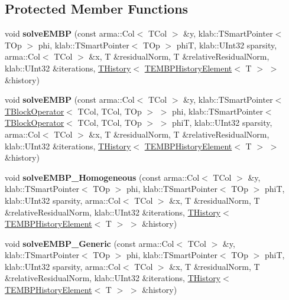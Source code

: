 \subsection*{Protected Member Functions}
\begin{DoxyCompactItemize}
\item 
void {\bfseries solve\+E\+M\+BP} (const arma\+::\+Col$<$ T\+Col $>$ \&y, klab\+::\+T\+Smart\+Pointer$<$ T\+Op $>$ phi, klab\+::\+T\+Smart\+Pointer$<$ T\+Op $>$ phiT, klab\+::\+U\+Int32 sparsity, arma\+::\+Col$<$ T\+Col $>$ \&x, T \&residual\+Norm, T \&relative\+Residual\+Norm, klab\+::\+U\+Int32 \&iterations, \hyperlink{classkl1p_1_1THistory}{T\+History}$<$ \hyperlink{classkl1p_1_1TEMBPHistoryElement}{T\+E\+M\+B\+P\+History\+Element}$<$ T $>$ $>$ \&history)\hypertarget{classkl1p_1_1TEMBPSolver_a47d227e9eda5cca46bd5c8539aa6547f}{}\label{classkl1p_1_1TEMBPSolver_a47d227e9eda5cca46bd5c8539aa6547f}

\item 
void {\bfseries solve\+E\+M\+BP} (const arma\+::\+Col$<$ T\+Col $>$ \&y, klab\+::\+T\+Smart\+Pointer$<$ \hyperlink{classkl1p_1_1TBlockOperator}{T\+Block\+Operator}$<$ T\+Col, T\+Col, T\+Op $>$ $>$ phi, klab\+::\+T\+Smart\+Pointer$<$ \hyperlink{classkl1p_1_1TBlockOperator}{T\+Block\+Operator}$<$ T\+Col, T\+Col, T\+Op $>$ $>$ phiT, klab\+::\+U\+Int32 sparsity, arma\+::\+Col$<$ T\+Col $>$ \&x, T \&residual\+Norm, T \&relative\+Residual\+Norm, klab\+::\+U\+Int32 \&iterations, \hyperlink{classkl1p_1_1THistory}{T\+History}$<$ \hyperlink{classkl1p_1_1TEMBPHistoryElement}{T\+E\+M\+B\+P\+History\+Element}$<$ T $>$ $>$ \&history)\hypertarget{classkl1p_1_1TEMBPSolver_a78f4dd58130e5ce14e4e732b6b2e2f90}{}\label{classkl1p_1_1TEMBPSolver_a78f4dd58130e5ce14e4e732b6b2e2f90}

\item 
void {\bfseries solve\+E\+M\+B\+P\+\_\+\+Homogeneous} (const arma\+::\+Col$<$ T\+Col $>$ \&y, klab\+::\+T\+Smart\+Pointer$<$ T\+Op $>$ phi, klab\+::\+T\+Smart\+Pointer$<$ T\+Op $>$ phiT, klab\+::\+U\+Int32 sparsity, arma\+::\+Col$<$ T\+Col $>$ \&x, T \&residual\+Norm, T \&relative\+Residual\+Norm, klab\+::\+U\+Int32 \&iterations, \hyperlink{classkl1p_1_1THistory}{T\+History}$<$ \hyperlink{classkl1p_1_1TEMBPHistoryElement}{T\+E\+M\+B\+P\+History\+Element}$<$ T $>$ $>$ \&history)\hypertarget{classkl1p_1_1TEMBPSolver_a10338258f5776caa83cfda65f908d00d}{}\label{classkl1p_1_1TEMBPSolver_a10338258f5776caa83cfda65f908d00d}

\item 
void {\bfseries solve\+E\+M\+B\+P\+\_\+\+Generic} (const arma\+::\+Col$<$ T\+Col $>$ \&y, klab\+::\+T\+Smart\+Pointer$<$ T\+Op $>$ phi, klab\+::\+T\+Smart\+Pointer$<$ T\+Op $>$ phiT, klab\+::\+U\+Int32 sparsity, arma\+::\+Col$<$ T\+Col $>$ \&x, T \&residual\+Norm, T \&relative\+Residual\+Norm, klab\+::\+U\+Int32 \&iterations, \hyperlink{classkl1p_1_1THistory}{T\+History}$<$ \hyperlink{classkl1p_1_1TEMBPHistoryElement}{T\+E\+M\+B\+P\+History\+Element}$<$ T $>$ $>$ \&history)\hypertarget{classkl1p_1_1TEMBPSolver_ac74440d0d069be695d06eec08b860578}{}\label{classkl1p_1_1TEMBPSolver_ac74440d0d069be695d06eec08b860578}

\end{DoxyCompactItemize}
